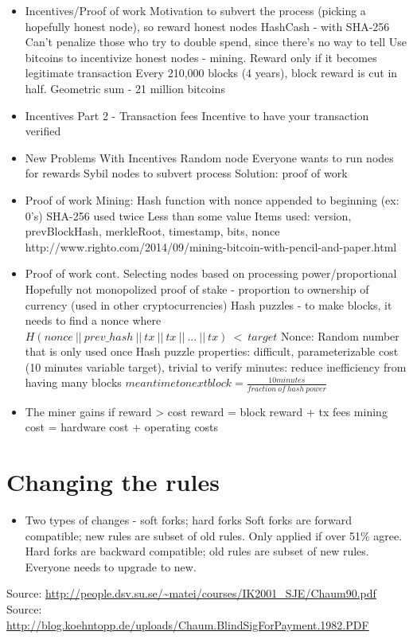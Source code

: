\documentclass{article}
\begin{document}
\begin{itemize}
  \item Incentives/Proof of work
    \subitem Motivation to subvert the process (picking a hopefully honest node), so reward honest nodes
    \subitem HashCash - with SHA-256
    \subitem Can't penalize those who try to double spend, since there's no way to tell
    \subitem Use bitcoins to incentivize honest nodes - mining. Reward only if it becomes legitimate transaction
    \subitem Every 210,000 blocks (4 years), block reward is cut in half. Geometric sum - 21 million bitcoins
  \item Incentives Part 2 - Transaction fees
    \subitem Incentive to have your transaction verified
  \item New Problems With Incentives
    \subitem Random node
    \subitem Everyone wants to run nodes for rewards
    \subitem Sybil nodes to subvert process
    \subitem Solution: proof of work
  \item Proof of work
    \subitem Mining: Hash function with nonce appended to beginning (ex: 0's)
    \subitem SHA-256 used twice
    \subitem Less than some value
    \subitem Items used: version, prevBlockHash, merkleRoot, timestamp, bits, nonce
    \subitem http://www.righto.com/2014/09/mining-bitcoin-with-pencil-and-paper.html
  \item Proof of work cont.
    \subitem Selecting nodes based on processing power/proportional
    \subitem Hopefully not monopolized
    \subitem proof of stake - proportion to ownership of currency (used in other cryptocurrencies)
    \subitem Hash puzzles - to make blocks, it needs to find a nonce where\\
    $ H(nonce\ ||\ prev\_hash\ ||\ tx\ ||\ tx\ ||\ ...\ ||\ tx)\ <\ target $
    \subitem Nonce: Random number that is only used once
    \subitem Hash puzzle properties: difficult, parameterizable cost (10 minutes variable target), trivial to verify
     minutes: reduce inefficiency from having many blocks
    \subitem $ mean time to next block = \frac{10 minutes}{fraction\ of\ hash\ power} $
  \item The miner gains if reward > cost
    \subitem reward = block reward + tx fees
    \subitem mining cost = hardware cost + operating costs
\end{itemize}


\section*{Changing the rules}
\begin{itemize}
  \item Two types of changes - soft forks; hard forks
    \subitem Soft forks are forward compatible; new rules are subset of old rules. Only applied if over 51\% agree.
    \subitem Hard forks are backward compatible; old rules are subset of new rules. Everyone needs to upgrade to new.
\end{itemize}



Source: \url{http://people.dsv.su.se/~matei/courses/IK2001_SJE/Chaum90.pdf}\\
Source: \url{http://blog.koehntopp.de/uploads/Chaum.BlindSigForPayment.1982.PDF}
\end{document}

